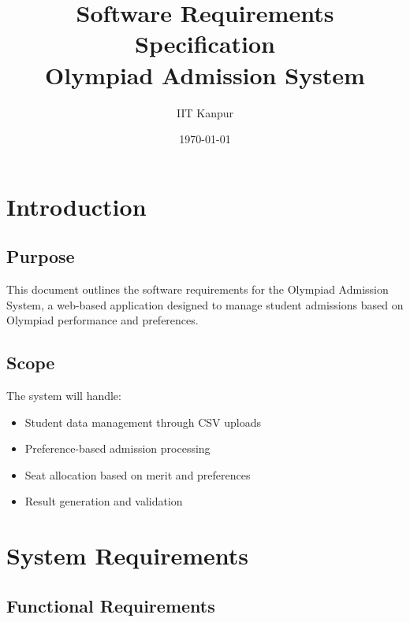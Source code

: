 \documentclass[12pt]{article}
\title{Software Requirements Specification\\
       Olympiad Admission System}
\author{IIT Kanpur}
\date{\today}
\begin{document}
\maketitle

\tableofcontents
\newpage

\section{Introduction}
\subsection{Purpose}
This document outlines the software requirements for the Olympiad Admission System, a web-based application designed to manage student admissions based on Olympiad performance and preferences.

\subsection{Scope}
The system will handle:
\begin{itemize}
    \item Student data management through CSV uploads
    \item Preference-based admission processing
    \item Seat allocation based on merit and preferences
    \item Result generation and validation
\end{itemize}

\section{System Requirements}

\subsection{Functional Requirements}
\end{document}
